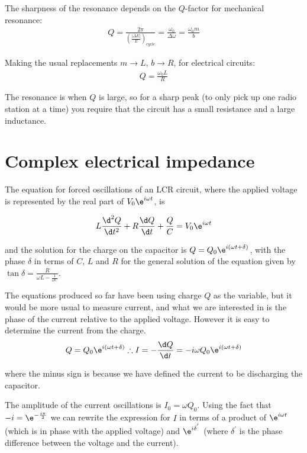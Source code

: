 \documentclass[
]{book}
\begin{document}
The sharpness of the resonance depends on the \(Q\)-factor for mechanical
resonance: \[\begin{aligned}
Q = \frac{2\pi}{ \left( \frac{|\Delta E|}{E} \right)_{cycle} } = \frac{\omega_0}{\Delta \omega} = \frac{\omega_0 m}{b}
\end{aligned}\]

Making the usual replacements \(m \rightarrow L\), \(b \rightarrow R\), for
electrical circuits: \[\begin{aligned}
Q = \frac{\omega_0 L}{R}
\end{aligned}\]

The resonance is when \(Q\) is large, so for a sharp peak (to only pick up
one radio station at a time) you require that the circuit has a small
resistance and a large inductance.

\hypertarget{complex-electrical-impedance}{%
\section{Complex electrical impedance}\label{complex-electrical-impedance}}

The equation for forced oscillations of an LCR circuit, where the
applied voltage is represented by the real part of \(V_0 \e^{i\omega t}\),
is

\[L \frac{ \d^2 Q}{\d t^2} + R \frac{\d Q}{\d t} + \frac{Q}{C} = V_0 \e^{i\omega t}\]

and the solution for the charge on the capacitor is
\(Q = Q_0 \e^{ i(\omega t + \delta)}\), with the phase \(\delta\) in terms
of \(C\), \(L\) and \(R\) for the general solution of the equation given by
\(\tan \delta = \frac{R}{ \omega L - \frac{1}{\omega C} }\).

The equations produced so far have been using charge \(Q\) as the
variable, but it would be more usual to measure current, and what we are
interested in is the phase of the current relative to the applied
voltage. However it is easy to determine the current from the charge.
\[Q = Q_0 \e^{i(\omega t + \delta)}  \therefore I = -\frac{\d Q}{\d t} = -i \omega Q_0 \e^{i(\omega t + \delta)}\]

where the minus sign is because we have defined the current to be
discharging the capacitor.

The amplitude of the current oscillations is \(I_0 = \omega Q_0\). Using
the fact that \(-i = \e^{ -\frac{i\pi}{2} }\) we can rewrite the
expression for \(I\) in terms of a product of \(\e^{i\omega t}\) (which is
in phase with the applied voltage) and \(\e^{i\delta^{'}}\) (where
\(\delta^{'}\) is the phase difference between the voltage and the
current).
\end{document}
